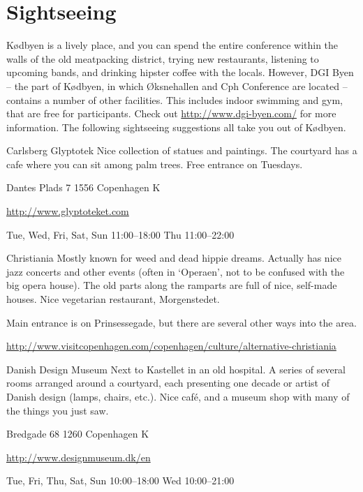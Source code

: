 \section{Sightseeing}
Kødbyen is a lively place, and you can spend the entire conference within the walls of the old meatpacking district, trying new restaurants, listening to upcoming bands, and drinking hipster coffee with the locals. However, DGI Byen – the part of Kødbyen, in which Øksnehallen and Cph Conference are located – contains a number of other facilities. This includes indoor swimming and gym, that are free for participants. Check out \url{http://www.dgi-byen.com/} for more information. The following sightseeing suggestions all take you out of Kødbyen.
\par
\bigskip
\begin{funitem}
{Carlsberg Glyptotek}
{Nice collection of statues and paintings. The courtyard has a cafe where you can sit among palm trees. Free entrance on Tuesdays.}
{\begin{addr}
{Dantes Plads 7}
{1556 Copenhagen K}
\end{addr}}
{\url{http://www.glyptoteket.com}}
{\begin{ohours}
{Tue, Wed, Fri, Sat, Sun}
{11:00–18:00}
{Thu}
{11:00–22:00}
{}
{}
{}
{}
\end{ohours}}
\end{funitem}
\begin{funitemshortaddr}
{Christiania}
{Mostly known for weed and dead hippie dreams. Actually has nice jazz concerts and other events (often in ‘Operaen’, not to be confused with the big opera house). The old parts along the ramparts are full of nice, self-made houses. Nice vegetarian restaurant, Morgenstedet. }
{\begin{shortaddr}
{Main entrance is on Prinsessegade, but there are several other ways into the area.}
\end{shortaddr}}
{\url{http://www.visitcopenhagen.com/copenhagen/culture/alternative-christiania }}
\end{funitemshortaddr}
\begin{funitem}
{Danish Design Museum}
{Next to Kastellet in an old hospital. A series of several rooms arranged around a courtyard, each presenting one decade or artist of Danish design (lamps, chairs, etc.). Nice café, and a museum shop with many of the things you just saw.}
{\begin{addr}
{Bredgade 68}
{1260 Copenhagen K}
\end{addr}}
{\url{http://www.designmuseum.dk/en}}
{\begin{ohours}
{Tue, Fri, Thu, Sat, Sun}
{10:00–18:00}
{Wed}
{10:00–21:00}
{}
{}
{}
{}
\end{ohours}}
\end{funitem}
